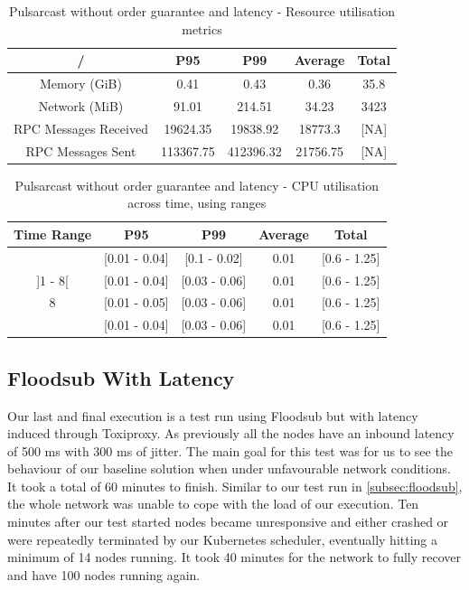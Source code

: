 \begin{table}[!htb]
\caption{Pulsarcast without order guarantee and latency - Resource utilisation metrics}
\label{table:pulsarcast-latency}
  \begin{center}
   \begin{tabular}{|c| c c c c|} 
   \hline
   / & P95 & P99 & Average & Total \\ [0.5ex] 
   \hline\hline
   Memory (GiB) & 0.41 & 0.43 & 0.36 & 35.8 \\
   \hline
   Network (MiB) & 91.01 & 214.51 & 34.23 & 3423 \\
   \hline
   RPC Messages Received & 19624.35 & 19838.92 & 18773.3 & [NA] \\
   \hline
   RPC Messages Sent & 113367.75 & 412396.32 & 21756.75 & [NA] \\ [1ex] 
   \hline
  \end{tabular}
  \end{center}
\end{table}

\begin{table}[!htb]
\caption{Pulsarcast without order guarantee and latency - CPU utilisation across time, using ranges}
\label{table:pulsarcast-latency-cpu}
  \begin{center}
   \begin{tabular}{|c| c c c c|} 
   \hline
   Time Range & P95 & P99 & Average & Total \\ [0.5ex] 
   \hline\hline
   [0 - 1] & [0.01 - 0.04] & [0.1 - 0.02] & 0.01 & [0.6 - 1.25] \\
   \hline
   ]1 - 8[ & [0.01 - 0.04] & [0.03 - 0.06]  & 0.01 & [0.6 - 1.25] \\
   \hline
   8 & [0.01 - 0.05] & [0.03 - 0.06] & 0.01 & [0.6 - 1.25] \\
   \hline
   [8 - 13] & [0.01 - 0.04] & [0.03 - 0.06]  & 0.01 & [0.6 - 1.25] \\
   \hline
  \end{tabular}
  \end{center}
\end{table}

\subsection{Floodsub With Latency}\label{subsec:floodsub-with-latency}

Our last and final execution is a test run using Floodsub but with latency
induced through Toxiproxy. As previously all the nodes have an inbound latency
of 500 ms with 300 ms of jitter. The main goal for this test was for us to see
the behaviour of our baseline solution when under unfavourable network
conditions. It took a total of 60 minutes to finish. Similar to our test run in
\ref{subsec:floodsub}, the whole network was unable to cope with the load of
our execution. Ten minutes after our test started nodes became unresponsive and
either crashed or were repeatedly terminated by our Kubernetes scheduler,
eventually hitting a minimum of 14 nodes running. It took 40 minutes for the
network to fully recover and have 100 nodes running again.

